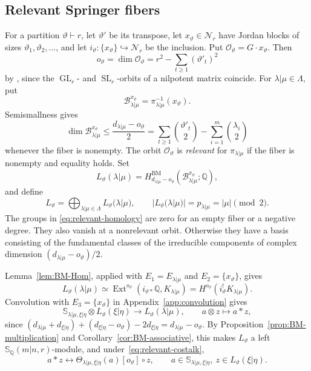 \documentclass[11pt,a4paper]{amsart}
\theoremstyle{definition}
\theoremstyle{remark}
\newcommand{\Q}{\mathbb Q}
\newcommand{\N}{\mathcal N}
\newcommand{\bS}{\mathbb S}
\newcommand{\BM}{\mathrm{BM}}
\newcommand{\Ext}{\operatorname{Ext}}
\newcommand{\lm}{\lambda|\mu}
\newcommand{\xh}{\xi|\eta}
\numberwithin{equation}{section}
\begin{document}
\subsection{Relevant Springer fibers}
For a partition $\vartheta\vdash r$, let $\vartheta'$ be its transpose,
let $x_\vartheta\in\N_r$ have Jordan blocks of sizes
$\vartheta_1,\vartheta_2,\ldots$, and let
$i_\vartheta:\{x_\vartheta\}\hookrightarrow\N_r$ be the inclusion. Put
$\mathcal O_\vartheta=G\cdot x_\vartheta$. Then
\begin{equation}\label{eq:nil-orbit}
o_\vartheta=\dim\mathcal O_\vartheta=r^2-\sum_{t\geq1}(\vartheta'_t)^2
\end{equation}
by \cite[Corollary~6.1.4]{CM}, since the $\operatorname{GL}_r$- and
$\operatorname{SL}_r$-orbits of a nilpotent matrix coincide.
For $\lm\in\Lambda$, put
$$
\mathcal B_{\lm}^{x_\vartheta}=\pi_{\lm}^{-1}(x_\vartheta).
$$
Semismallness gives
\begin{equation}\label{eq:relevant-dimension}
\dim\mathcal B_{\lm}^{x_\vartheta}\leq\frac{d_{\lm}-o_\vartheta}{2}
=\sum_{t\geq1}\binom{\vartheta'_t}{2}
 -\sum_{i=1}^m\binom{\lambda_i}{2}
\end{equation}
whenever the fiber is nonempty. The orbit $\mathcal O_\vartheta$ is
\emph{relevant} for $\pi_{\lm}$ if the fiber is nonempty and equality
holds. Set
\begin{equation}\label{eq:relevant-homology}
L_\vartheta(\lm)
=H^{\BM}_{d_{\lm}-o_\vartheta}
  (\mathcal B_{\lm}^{x_\vartheta};\Q),
\end{equation}
and define
\begin{equation}\label{eq:simple-fibers}
L_\vartheta
=\bigoplus_{\lm\in\Lambda}L_\vartheta(\lm),
\qquad |L_\vartheta(\lm)|=p_{\lm}=|\mu|\pmod2.
\end{equation}
The groups in \eqref{eq:relevant-homology} are zero for an empty
fiber or a negative degree. They also vanish at a nonrelevant orbit.
Otherwise they have a basis consisting of the fundamental classes of
the irreducible components of complex dimension
$(d_{\lm}-o_\vartheta)/2$.

Lemma~\ref{lem:BM-Hom}, applied with $E_1=E_{\lm}$ and
$E_2=\{x_\vartheta\}$, gives
\begin{equation}\label{eq:relevant-costalk}
L_\vartheta(\lm)
\simeq\Ext^{o_\vartheta}(i_{\vartheta*}\Q,K_{\lm})
=H^{o_\vartheta}(i_\vartheta^!K_{\lm}).
\end{equation}
Convolution with $E_3=\{x_\vartheta\}$ in Appendix~\ref{app:convolution} gives
\begin{equation}\label{eq:relevant-convolution}
\bS_{\lm,\xh}\otimes L_\vartheta(\xh)
\longrightarrow L_\vartheta(\lm),\qquad a\otimes z\longmapsto a*z,
\end{equation}
since
$(d_{\lm}+d_{\xh})+(d_{\xh}-o_\vartheta)-2d_{\xh}=d_{\lm}-o_\vartheta$.
By Proposition~\ref{prop:BM-multiplication} and
Corollary~\ref{cor:BM-associative}, this makes $L_\vartheta$ a
left $\bS_\Q(m|n,r)$-module, and under~\eqref{eq:relevant-costalk},
\begin{equation}\label{eq:relevant-action}
a*z\longleftrightarrow\Theta_{\lm,\xh}(a)[o_\vartheta]\circ z,
\qquad a\in\bS_{\lm,\xh},\ z\in L_\vartheta(\xh).
\end{equation}
\end{document}
